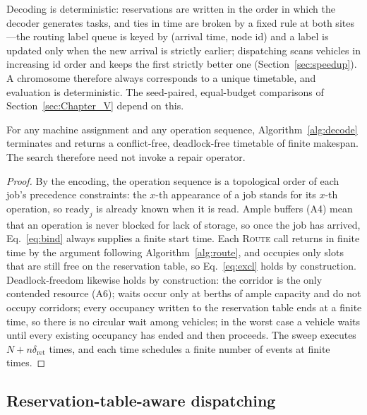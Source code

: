 Decoding is deterministic: reservations are written in the order in which the decoder generates tasks, and ties in time are broken by a fixed rule at both sites---the routing label queue is keyed by (arrival time, node id) and a label is updated only when the new arrival is strictly earlier;
dispatching scans vehicles in increasing id order and keeps the first strictly better one (Section~\ref{sec:speedup}).
A chromosome therefore always corresponds to a unique timetable, and evaluation is deterministic. The seed-paired, equal-budget comparisons of Section~\ref{sec:Chapter_V} depend on this.

\begin{prop}
  \label{prop:decodable}
  For any machine assignment and any operation sequence, Algorithm~\ref{alg:decode} terminates and returns a conflict-free, deadlock-free timetable of finite makespan. The search therefore need not invoke a repair operator.
\end{prop}

\begin{proof}
  By the encoding, the operation sequence is a topological order of each job's precedence constraints: the $x$-th appearance of a job stands for its $x$-th operation, so $\mathrm{ready}_j$ is already known when it is read.
  Ample buffers (A4) mean that an operation is never blocked for lack of storage, so once the job has arrived, Eq.~\eqref{eq:bind} always supplies a finite start time.
  Each \textsc{Route} call returns in finite time by the argument following Algorithm~\ref{alg:route}, and occupies only slots that are still free on the reservation table, so Eq.~\eqref{eq:excl} holds by construction.
  Deadlock-freedom likewise holds by construction: the corridor is the only contended resource (A6); waits occur only at berths of ample capacity and do not occupy corridors; every occupancy written to the reservation table ends at a finite time, so there is no circular wait among vehicles; in the worst case a vehicle waits until every existing occupancy has ended and then proceeds.
  The sweep executes $N+n\delta_{\mathrm{ret}}$ times, and each time schedules a finite number of events at finite times.
\end{proof}

\subsection{Reservation-table-aware dispatching}
\label{sec:dispatch}

